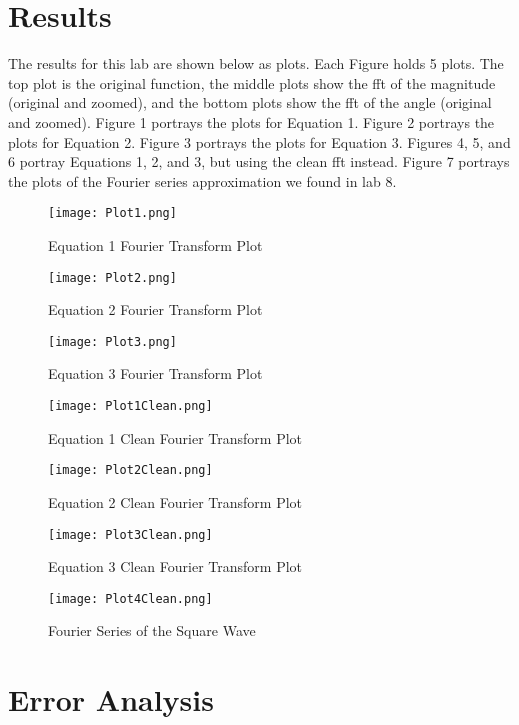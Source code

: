 \documentclass[12pt]{report}
\begin{document}
\newpage

\section{Results}

The results for this lab are shown below as plots. Each Figure holds 5 plots. The top plot is the original function, the middle plots show the fft of the magnitude (original and zoomed), and the bottom plots show the fft of the angle (original and zoomed). Figure 1 portrays the plots for Equation 1. Figure 2 portrays the plots for Equation 2. Figure 3 portrays the plots for Equation 3. Figures 4, 5, and 6 portray Equations 1, 2, and 3, but using the clean fft instead. Figure 7 portrays the plots of the Fourier series approximation we found in lab 8. 


\begin{figure}
\texttt{[image: Plot1.png]}
\caption{Equation 1 Fourier Transform Plot}
\end{figure}

\begin{figure}
\texttt{[image: Plot2.png]}
\caption{Equation 2 Fourier Transform Plot}
\end{figure}

\begin{figure}
\texttt{[image: Plot3.png]}
\caption{Equation 3 Fourier Transform Plot}
\end{figure}

\begin{figure}
\texttt{[image: Plot1Clean.png]}
\caption{Equation 1 Clean Fourier Transform Plot}
\end{figure}

\begin{figure}
\texttt{[image: Plot2Clean.png]}
\caption{Equation 2 Clean Fourier Transform Plot}
\end{figure}

\begin{figure}
\texttt{[image: Plot3Clean.png]}
\caption{Equation 3 Clean Fourier Transform Plot}
\end{figure}

\begin{figure}
\texttt{[image: Plot4Clean.png]}
\caption{Fourier Series of the Square Wave}
\end{figure}
\newpage

\section{Error Analysis}
\end{document}
